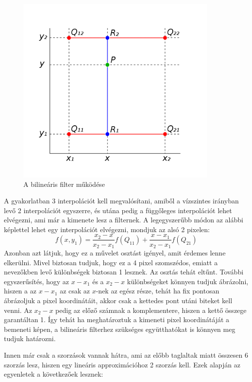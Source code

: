\begin{figure}[!ht]
	\centering
	\includegraphics[width=100mm, keepaspectratio]{figures/bilinear.png}
	\caption{A bilineáris filter működése \cite{Wikipediabilinear_2024}} 
	\label{pic:bilinear}
\end{figure}
\newpage

A gyakorlatban 3 interpolációt kell megvalósítani, amiből a vízszintes irányban levő 2 interpolációt egyszerre, és utána pedig a függőleges interpolációt lehet elvégezni, ami már a kimenete lesz a filternek. A legegyszerűbb módon az alábbi képlettel lehet egy interpolációt elvégezni, mondjuk az alsó 2 pixelen:
\begin{equation}
	f(x,y_1) = \frac{x_2-x}{x_2-x_1}f(Q_{11}) + \frac{x-x_1}{x_2-x_1}f(Q_{21})
\end{equation}
Azonban azt látjuk, hogy ez a művelet osztást igényel, amit érdemes lenne elkerülni. Mivel biztosan tudjuk, hogy ez a 4 pixel szomszédos, emiatt a nevezőkben levő különbségek biztosan 1 lesznek. Az osztás tehát eltűnt. További egyszerűsítés, hogy az $x-x_1$ és a $x_2-x$ különbségeket könnyen tudjuk ábrázolni, hiszen a az $x-x_1$ az csak az $x$-nek az egész része, tehát ha fix pontosan ábrázoljuk a pixel koordinátáit, akkor csak a kettedes pont utáni biteket kell venni. Az $x_2-x$ pedig az előző számnak a komplementere, hiszen a kettő összege garantáltan 1. Így tehát ha meghatároztuk a kimeneti pixel koordinátáját a bemeneti képen, a bilineáris filterhez szükséges együtthatókat is könnyen meg tudjuk határozni. 

Innen már csak a szorzások vannak hátra, ami az előbb taglaltak miatt összesen 6 szorzás lesz, hiszen egy lineáris approximációhoz 2 szorzás kell. Ezek alapján az egyenletek a következőek lesznek:


